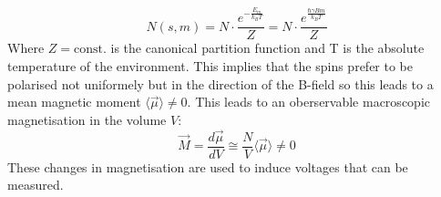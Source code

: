 			\begin{equation}
				N(s,m) = N \cdot \frac{e^{-\frac{E_m}{k_BT}}}{Z} = N \cdot \frac{e^{\frac{\hbar \gamma B m}{k_BT}}}{Z}
			\end{equation}
		Where $Z = \text{const.}$ is the canonical partition function and T is the absolute temperature of the environment. This implies that the spins prefer to be polarised not uniformely but in the direction of the B-field so this leads to a mean magnetic moment $\langle\vec{\mu}\rangle \neq 0$. This leads to an oberservable macroscopic magnetisation in the volume $V$:
			\begin{equation}
				\vec{M} = \frac{d\vec{\mu}}{dV} \cong \frac{N}{V} \langle\vec{\mu}\rangle \neq 0
			\end{equation}
		These changes in magnetisation are used to induce voltages that can be measured.